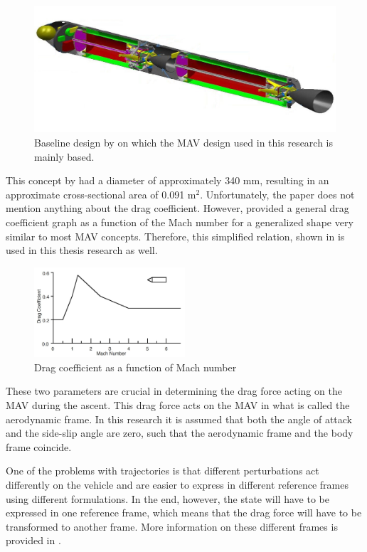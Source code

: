 \begin{figure}[H]
\centering
\includegraphics[width=0.5 \textwidth]{figures/launcher_methods/baseline_liquid2_trinidad2012.jpg}
\caption{Baseline design by \cite{trinidad2012} on which the \ac{MAV} design used in this research is mainly based.}
\label{fig:baseline_liquid2_trinidad2012}
\end{figure}

\noindent
This concept by \cite{trinidad2012} had a diameter of approximately 340 mm, resulting in an approximate cross-sectional area of 0.091 m$^{2}$. Unfortunately, the paper does not mention anything about the drag coefficient. However, \cite{whitehead2004mars} provided a general drag coefficient graph as a function of the Mach number for a generalized shape very similar to most \ac{MAV} concepts. Therefore, this simplified relation, shown in  is used in this thesis research as well.

\begin{figure}[H]
\centering
\includegraphics[width=0.5\textwidth]{figures/launcher_methods/dragcoeff_whitehead2004mars.jpg}
\caption{Drag coefficient as a function of Mach number \citep{whitehead2004mars}}
\label{fig:dragcoeff_whitehead2004mars}
\end{figure}

\noindent
These two parameters are crucial in determining the drag force acting on the \ac{MAV} during the ascent. This drag force acts on the \ac{MAV} in what is called the aerodynamic frame. In this research it is assumed that both the angle of attack and the side-slip angle are zero, such that the aerodynamic frame and the body frame coincide.

One of the problems with trajectories is that different perturbations act differently on the vehicle and are easier to express in different reference frames using different formulations. In the end, however, the state will have to be expressed in one reference frame, which means that the drag force will have to be transformed to another frame. More information on these different frames is provided in .


